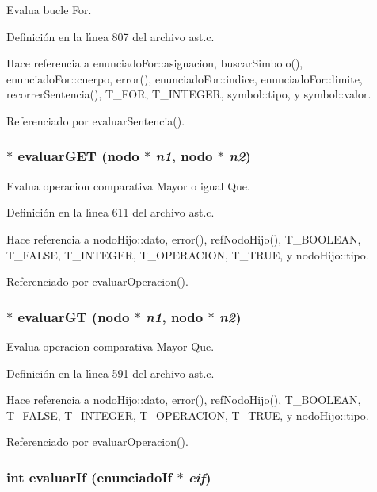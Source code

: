 Evalua bucle For. 



Definici\'{o}n en la l\'{\i}nea 807 del archivo ast.c.

Hace referencia a enunciado\-For::asignacion, buscar\-Simbolo(), enunciado\-For::cuerpo, error(), enunciado\-For::indice, enunciado\-For::limite, recorrer\-Sentencia(), T\_\-FOR, T\_\-INTEGER, symbol::tipo, y symbol::valor.

Referenciado por evaluar\-Sentencia().
\subsubsection{$\ast$ evaluar\-GET ({\bf nodo} $\ast$ {\em n1}, {\bf nodo} $\ast$ {\em n2})}\label{ast_8c_a32}


Evalua operacion comparativa Mayor o igual Que. 



Definici\'{o}n en la l\'{\i}nea 611 del archivo ast.c.

Hace referencia a nodo\-Hijo::dato, error(), ref\-Nodo\-Hijo(), T\_\-BOOLEAN, T\_\-FALSE, T\_\-INTEGER, T\_\-OPERACION, T\_\-TRUE, y nodo\-Hijo::tipo.

Referenciado por evaluar\-Operacion().
\subsubsection{$\ast$ evaluar\-GT ({\bf nodo} $\ast$ {\em n1}, {\bf nodo} $\ast$ {\em n2})}\label{ast_8c_a31}


Evalua operacion comparativa Mayor Que. 



Definici\'{o}n en la l\'{\i}nea 591 del archivo ast.c.

Hace referencia a nodo\-Hijo::dato, error(), ref\-Nodo\-Hijo(), T\_\-BOOLEAN, T\_\-FALSE, T\_\-INTEGER, T\_\-OPERACION, T\_\-TRUE, y nodo\-Hijo::tipo.

Referenciado por evaluar\-Operacion().
\subsubsection{\setlength{\rightskip}{0pt plus 5cm}int evaluar\-If ({\bf enunciado\-If} $\ast$ {\em eif})}\label{ast_8c_a39}


